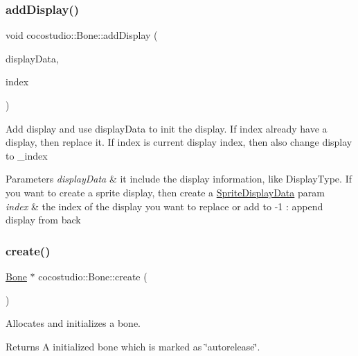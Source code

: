 \subsubsection{\texorpdfstring{add\+Display()}{addDisplay()}\hspace{0.1cm}{\footnotesize\ttfamily [2/2]}}
{\footnotesize\ttfamily void cocostudio\+::\+Bone\+::add\+Display (\begin{DoxyParamCaption}\item[{\hyperlink{classcocostudio_1_1DisplayData}{Display\+Data} $\ast$}]{display\+Data,  }\item[{int}]{index }\end{DoxyParamCaption})}

Add display and use display\+Data to init the display. If index already have a display, then replace it. If index is current display index, then also change display to \+\_\+index


\begin{DoxyParams}{Parameters}
{\em display\+Data} & it include the display information, like Display\+Type. If you want to create a sprite display, then create a \hyperlink{classcocostudio_1_1SpriteDisplayData}{Sprite\+Display\+Data} param\\
\hline
{\em index} & the index of the display you want to replace or add to -\/1 \+: append display from back \\
\hline
\end{DoxyParams}
\mbox{\label{classcocostudio_1_1Bone_aba577a9c08804274ad1914331572959b}} 
\subsubsection{\texorpdfstring{create()}{create()}\hspace{0.1cm}{\footnotesize\ttfamily [1/4]}}
{\footnotesize\ttfamily \hyperlink{classcocostudio_1_1Bone}{Bone} $\ast$ cocostudio\+::\+Bone\+::create (\begin{DoxyParamCaption}\item[{void}]{ }\end{DoxyParamCaption})\hspace{0.3cm}{\ttfamily [static]}}

Allocates and initializes a bone. \begin{DoxyReturn}{Returns}
A initialized bone which is marked as \char`\"{}autorelease\char`\"{}. 
\end{DoxyReturn}
\mbox{\label{classcocostudio_1_1Bone_ab20f5f5cb730a727333e3ea2dabcae3e}} 
